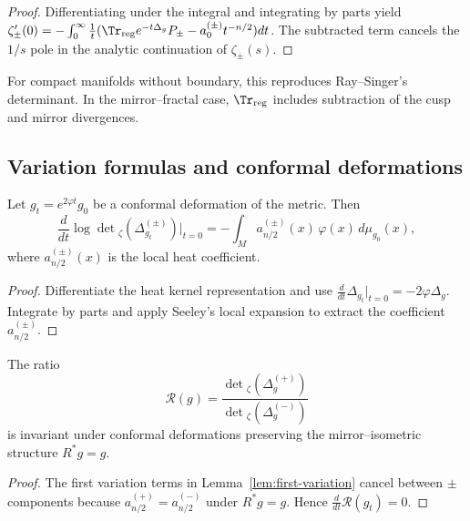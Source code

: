 \begin{proof}
Differentiating under the integral and integrating by parts yield $\zeta_\pm'(0)=-\int_0^\infty \tfrac{1}{t}(\Tr_{\mathrm{reg}}e^{-t\Delta_g}P_\pm - a_0^{(\pm)}t^{-n/2})dt$.  
The subtracted term cancels the $1/s$ pole in the analytic continuation of $\zeta_\pm(s)$. %
\end{proof}

\begin{remark}
\label{rem:normalization}
For compact manifolds without boundary, this reproduces Ray–Singer’s determinant.  
In the mirror–fractal case, $\Tr_{\mathrm{reg}}$ includes subtraction of the cusp and mirror divergences. %
\end{remark}

\subsection{Variation formulas and conformal deformations}
\label{subsec:ch6-part6-variation} \relax

\begin{lemma}
\label{lem:first-variation}
Let $g_t=e^{2\varphi t}g_0$ be a conformal deformation of the metric.  
Then
\[
\frac{d}{dt}\log\det{}_{\zeta}(\Delta_{g_t}^{(\pm)})\Big|_{t=0}
=-\int_M a_{n/2}^{(\pm)}(x)\,\varphi(x)\,d\mu_{g_0}(x),
\]
where $a_{n/2}^{(\pm)}(x)$ is the local heat coefficient. %
\end{lemma}

\begin{proof}
Differentiate the heat kernel representation and use $\frac{d}{dt}\Delta_{g_t}|_{t=0}=-2\varphi\Delta_g$.  
Integrate by parts and apply Seeley’s local expansion to extract the coefficient $a_{n/2}^{(\pm)}$. %
\end{proof}

\begin{theorem}
\label{thm:conformal-ratio}
The ratio
\[
\mathcal{R}(g)
=\frac{\det{}_{\zeta}(\Delta_g^{(+)})}{\det{}_{\zeta}(\Delta_g^{(-)})}
\]
is invariant under conformal deformations preserving the mirror–isometric structure $R^*g=g$. %
\end{theorem}

\begin{proof}
The first variation terms in Lemma~\ref{lem:first-variation} cancel between $\pm$ components because $a_{n/2}^{(+)}=a_{n/2}^{(-)}$ under $R^*g=g$.  
Hence $\frac{d}{dt}\mathcal{R}(g_t)=0$. %
\end{proof}

